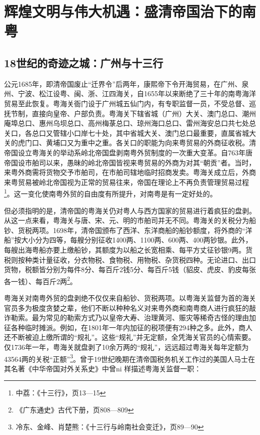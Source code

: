 \chapter{辉煌文明与伟大机遇：盛清帝国治下的南粤}

\section{18世纪的奇迹之城：广州与十三行}

\indent 公元1685年，即清帝国废止“迁界令”后两年，康熙帝下令开海贸易，在广州、泉州、宁波、松江设粤、闽、浙、江四海关，自1655年以来断绝了三十年的南粤海洋贸易至此恢复。粤海关衙门设于广州城五仙门内，有专职监督一员，不受总督、巡抚节制，直接向皇帝、户部负责。粤海关下辖省城（广州）大关、澳门总口、潮州庵埠总口、惠州乌坝总口、高州梅菉总口、琼州海口总口、雷州海安总口共七处总关口，各总口又管辖小口岸七十处，其中省城大关、澳门总口最重要，直属省城大关的虎门口、黄埔口又为重中之重。各关口的职能为向来粤贸易的外商征收税。清帝国设立粤海关的举动系岭北帝国盘剥南粤外贸制度的一次重大变革。自763年唐帝国设市舶司以来，愚昧的岭北帝国皆视来粤贸易的外商为对其“朝贡”者。当时，来粤外商需将货物交予市舶司，在市舶司辖地临时招商发卖。粤海关成立后，外商来粤贸易被岭北帝国视为正常的贸易往来，帝国在理论上不再负责管理贸易过程\footnote{中荔：《十三行》，页13—15}。这一变化使南粤外贸的自由度有所提升，对南粤是有一定好处的。

但必须指明的是，清帝国的粤海关仍对粤人与西方国家的贸易进行着疯狂的盘剥。从这一点来看，粤海关与唐、宋、元、明的市舶司并无不同。粤海关的关税分为船钞、货税两项。1698年，清帝国颁布了西洋、东洋商船的船钞额度，将外商的“洋船”按大小分为四等，每艘分别征收1400两、1100两、600两、400两钞银。此外，每艘出海粤船亦要上缴船钞，其额度为以船之长宽相乘、每平方丈征钞银9两。货税则按种类计量征收，分衣物税、食物税、用物税、杂货税四种。无论进口、出口货物，税额皆分别为每件8分、每百斤2钱5分、每百斤5钱（貂皮、虎皮、豹皮每张各一钱）、每百斤2两\footnote{《广东通史》古代下册，页808—809}。

粤海关对南粤外贸的盘剥绝不仅仅来自船钞、货税两项。以粤海关监督为首的海关官员多为极度贪婪之辈，他们不断以种种名义对来粤外商和南粤商人进行疯狂的敲诈勒索。最为常见的勒索方式乃以皇帝大寿、治理黄河、赈灾等稀奇古怪的理由加征各种临时摊派。例如，在1801年一年内加征的税项便有294种之多。此外，商人还不断被迫上缴所谓的“规礼”。这些“规礼”并无定额，全凭海关官员的心情索要。仅1736年一年，粤海关就盘剥了10余万两的“规礼”，远远超过粤海关每年定额为43564两的关税“正额”\footnote{冷东、金峰、肖楚熊：《十三行与岭南社会变迁》，页89—90}。曾于19世纪晚期在清帝国税务机关工作过的美国人马士在其名著《中华帝国对外关系史》中曾ni 样描述粤海关监督一职：

